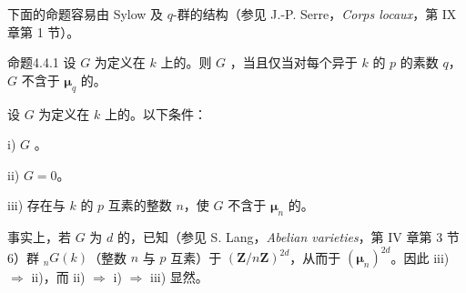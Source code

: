 下面的命题容易由 Sylow 及 $q$-群的结构（参见 J.-P. Serre，\textit{Corps locaux}，第 IX 章第 1 节）。
\begin{SGAresult}{命题}{4.4.1}
设 $G$ 为定义在 $k$ 上的。则 $G$ ，当且仅当对每个异于 $k$ 的 $p$ 的素数 $q$，$G$ 不含于 $\boldsymbol\mu_q$ 的。
\end{SGAresult}
设 $G$ 为定义在 $k$ 上的。以下条件：

i) $G$ 。

ii) $G=0$。

iii) 存在与 $k$ 的 $p$ 互素的整数 $n$，使 $G$ 不含于 $\boldsymbol\mu_n$ 的。

事实上，若 $G$ 为 $d$ 的，已知（参见 S. Lang，\textit{Abelian varieties}，第 IV 章第 3 节 6）群 ${}_nG(k)$（整数 $n$ 与 $p$ 互素）于 $(\mathbf Z/n\mathbf Z)^{2d}$，从而于 $(\boldsymbol\mu_n)^{2d}$。因此 iii) $\Rightarrow$ ii)，而 ii) $\Rightarrow$ i) $\Rightarrow$ iii) 显然。

